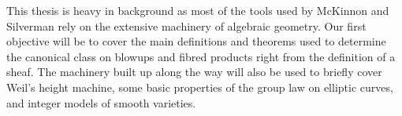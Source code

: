 \documentclass[12pt]{article}
\begin{document}
This thesis is heavy in background as most of the tools used by McKinnon and Silverman rely on the extensive machinery of algebraic geometry. 
Our first objective will be to cover the main definitions and theorems used to determine the canonical class on blowups and fibred products right from the definition of a sheaf.
The machinery built up along the way will also be used to briefly cover Weil's height machine, 
some basic properties of the group law on elliptic curves,
and integer models of smooth varieties.
\end{document}
